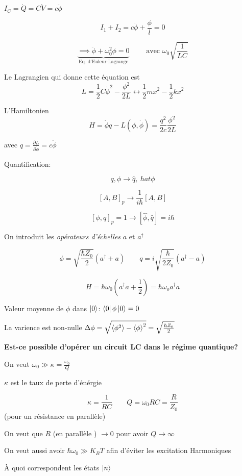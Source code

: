 $I_C = \dot Q = C \dot V = c \ddot \phi$

\[ I_1 + I_2 = c \ddot \phi + \frac{\phi}{l} = 0 \]

\[ 	\underbrace{\implies \ddot \phi + \omega_0^{2} \phi = 0}_{\text{Eq. d'Euleur-Lagrange} }  \qquad \text{ avec } \omega_0 \sqrt{\frac{1}{LC} }  \]

Le Lagrangien qui donne cette équation est \[ L = \frac{1}{2} C \dot \phi^{2}- \frac{\phi^{2}}{2L} \leftrightarrow \frac{1}{2} m x^{2}- \frac{1}{2} k x^{2} \]


L'Hamiltonien \[ H = \dot \phi q - L(\phi, \dot \phi) = \frac{q^{2}}{2c} \frac{\phi^{2}}{2L}   \]


avec $q = \frac{\partial {L}}{\partial {\dot \phi}} = c \dot \phi $


Quantification: 

\[ 	q, \phi \to \hat q,\ hat \phi \]


\[ 	[A, B]_p \to \frac{1}{i\hbar} [A, B]  \]

\[ [\phi, q]_p = 1 \to [\hat\phi, \hat q] = i\hbar  \]




On introduit les \textit{opérateurs d'échelles} $a$ et $a^{\dagger}$


\[ \phi = \sqrt{\frac{\hbar{}Z_0}{2} } \left( a^{\dagger} + a \right) \qquad q = i \sqrt{\frac{\hbar}{2Z_0} } \left( a^{\dagger}-a \right)  \]


\[ H = \hbar \omega_0 \left( a^{\dagger}a + \frac{1}{2}  \right)  =\hbar \omega_o a ^{\dagger} a\]


Valeur moyenne de $\phi$ dans $\ket{0}$: $\bra{0}\phi \ket{0} = 0$

La varience est non-nulle $\Delta \phi = \sqrt{\expval{\phi^2} - \expval{\phi}^2} = \sqrt{\hbar Z_0 \over 2}$


\textbf{Est-ce possible d'opérer un circuit LC dans le régime quantique?}


On veut $	\omega_0 \gg \kappa = \frac{\omega_0}{Q} $

$\kappa$ est le taux de perte d'énérgie

\[ \kappa = \frac{1}{RC} \qquad Q = \omega_0 RC = \frac{R}{Z_0}  \]
(pour un résistance en parallèle)


On veut que $R$ (en parallèle ) $\to 0$ pour avoir $Q \to \infty$


On veut aussi avoir $\hbar \omega_0 \gg K_B T$ afin d'éviter les excitation Harmoniques 


À quoi correspondent les états $\ket{n}$

